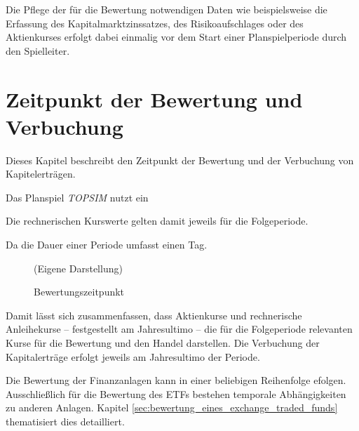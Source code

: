 \documentclass[12pt, a4paper]{article}
\begin{document}
Die Pflege der für die Bewertung notwendigen Daten wie beispielsweise die Erfassung des Kapitalmarktzinssatzes, des Risikoaufschlages oder des Aktienkurses erfolgt dabei einmalig vor dem Start einer Planspielperiode durch den Spielleiter.

\section{Zeitpunkt der Bewertung und Verbuchung}
\label{sec:zeitpunkt_und_durchfuehrung_der_bewertung_buchung}

Dieses Kapitel beschreibt den Zeitpunkt der Bewertung und der Verbuchung von Kapitelerträgen.

Das Planspiel \textit{TOPSIM} nutzt ein  

Die rechnerischen Kurswerte gelten damit jeweils für die Folgeperiode.


Da die Dauer einer Periode umfasst einen Tag. 

\begin{figure}[htb]
	\centering
	\caption{Bewertungszeitpunkt}
	\label{img:zeitstrahl_pewertung}
	(Eigene Darstellung)
\end{figure}

Damit lässt sich zusammenfassen, dass Aktienkurse und rechnerische Anleihekurse -- festgestellt am Jahresultimo -- die für die Folgeperiode relevanten Kurse für die Bewertung und den Handel darstellen. Die Verbuchung der Kapitalerträge erfolgt jeweils am Jahresultimo der Periode.

Die Bewertung der Finanzanlagen kann in einer beliebigen Reihenfolge efolgen. Ausschließlich für die Bewertung des ETFs bestehen temporale Abhängigkeiten zu anderen Anlagen. Kapitel \ref{sec:bewertung_eines_exchange_traded_funds} thematisiert dies detailliert.
\end{document}
